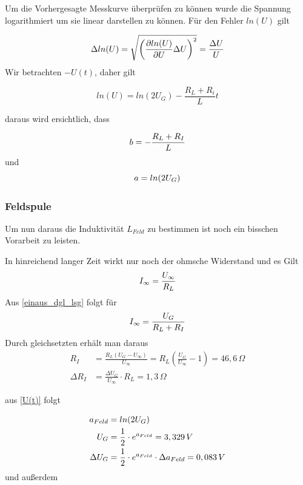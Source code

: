 \documentclass{article}
\begin{document}
Um die Vorhergesagte Messkurve überprüfen zu können wurde die Spannung logarithmiert um sie linear darstellen zu können. Für den Fehler \(ln(U)\) gilt

\begin{align}
\Delta ln(U) = \sqrt{\left(\frac{\partial ln(U)}{\partial U} \Delta U \right)^2} = \frac{\Delta U}{U}
\notag
\end{align}
\noindent
Wir betrachten \(-U(t)\), daher gilt

\begin{equation}
\label{U(t)}
ln(U) = ln(2U_G) - \frac{R_L+R_i}{L} t
\end{equation}


\noindent
daraus wird ersichtlich, dass



\begin{equation}
b = - \frac{R_L + R_I}{L}
\notag
\end{equation}
und
\begin{equation}
a = ln(2 U_G)
\notag
\end{equation}

\subsubsection{Feldspule}

\noindent
Um nun daraus die Induktivität \(L_{Feld}\) zu bestimmen ist noch ein bisschen Vorarbeit zu leisten.

In hinreichend langer Zeit wirkt nur noch der ohmsche Widerstand und es Gilt
\begin{equation}
I_\infty = \frac{U_\infty}{R_L}
\notag
\end{equation}
\noindent
Aus \eqref{einaus_dgl_lsg} folgt für 
\begin{equation}
I_\infty = \frac{U_G}{R_L+R_I}
\notag
\end{equation}
Durch gleichsetzten erhält man daraus
\begin{align}
R_I &= \frac{R_L \left( U_G - U_\infty \right)}{U_\infty} = 
R_L \left(\frac{U_G}{U_\infty} - 1 \right) = 46,6 \, \Omega
\label{R_I}
\\
\Delta R_I &= \frac{\Delta U_G}{U_\infty} \cdot R_L = 1,3 \, \Omega
\end{align}

\noindent
aus \eqref{U(t)} folgt 

\begin{align}
a_{Feld} &= ln(2U_G)
\notag
\\
U_G &= \frac{1}{2} \cdot e^{a_{Feld}} = 3,329 \, V
\notag
\\
\Delta U_G &= \frac{1}{2} \cdot e^{a_{Feld}} \cdot \Delta a_{Feld} = 0,083 \, V
\notag
\end{align}
\noindent
und außerdem
\end{document}
